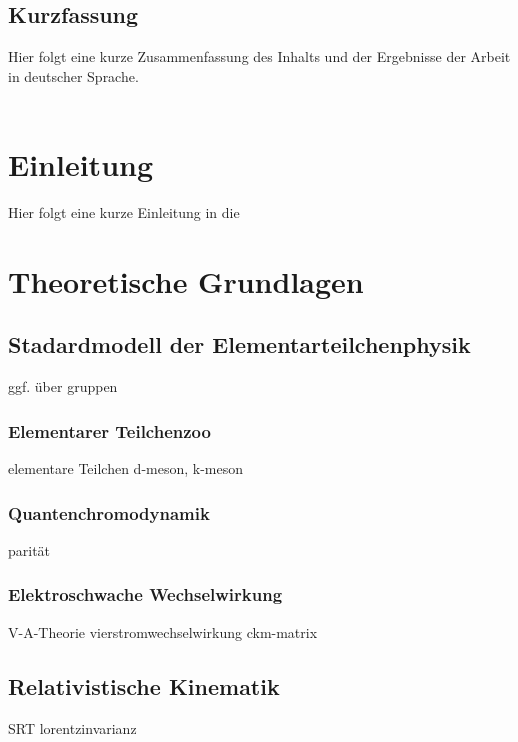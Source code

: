 \documentclass[11pt,a4paper,twoside]{report}
\begin{document}

\thispagestyle{empty}
\section*{Kurzfassung}
Hier folgt eine kurze Zusammenfassung des Inhalts und der Ergebnisse der Arbeit in deutscher Sprache.\\
\ \\

\newpage


\tableofcontents\newpage
{}
\listoffigures\newpage
{}
\listoftables\newpage

\setcounter{page}{0}

\chapter{Einleitung}

Hier folgt eine kurze Einleitung in die

\chapter{Theoretische Grundlagen}
\section{Stadardmodell der Elementarteilchenphysik}
ggf. über gruppen
\subsection{Elementarer Teilchenzoo}
elementare Teilchen
d-meson, k-meson
\subsection{Quantenchromodynamik}
parität

\subsection{Elektroschwache Wechselwirkung}
V-A-Theorie
vierstromwechselwirkung
ckm-matrix

\section{Relativistische Kinematik}
SRT
lorentzinvarianz
\end{document}
